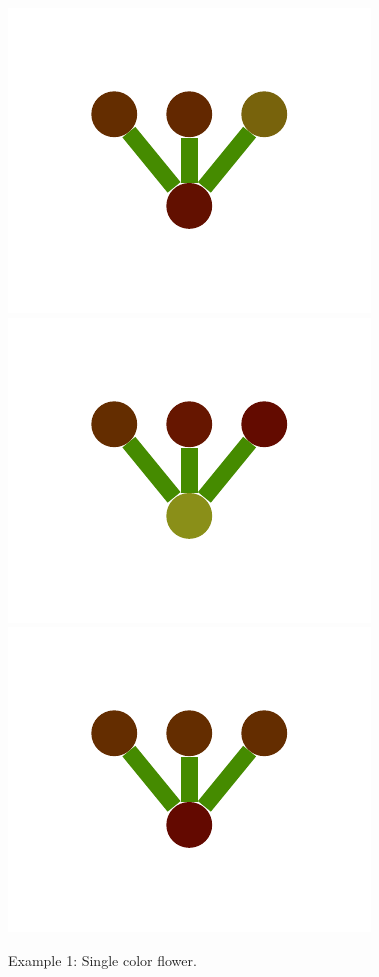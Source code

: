 \documentclass[a4paper,10pt]{article}
\begin{document}
\begin{figure}
{    \includegraphics[scale=.2]{../figures/vector/6-1-single-color-flower-induced-6.pdf}
    \includegraphics[scale=.2]{../figures/vector/6-1-single-color-flower-induced-7.pdf}
    \includegraphics[scale=.2]{../figures/vector/6-1-single-color-flower-induced-8.pdf}
    \label{fig:exp-single-flower-induced}    
    }
  \caption{Example 1: Single color flower.}
  \label{fig:exp-single-flower}
\end{figure}
\end{document}
